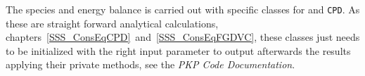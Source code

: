 The species and energy balance is carried out with specific classes for \FGDVC and \texttt{CPD}. As these are straight forward analytical calculations, chapters~\ref{SSS_ConsEqCPD}~and~\ref{SSS_ConsEqFGDVC}, these classes just needs to be initialized with the right input parameter to output afterwards the results applying their private methods, see the \emph{PKP Code Documentation}.
